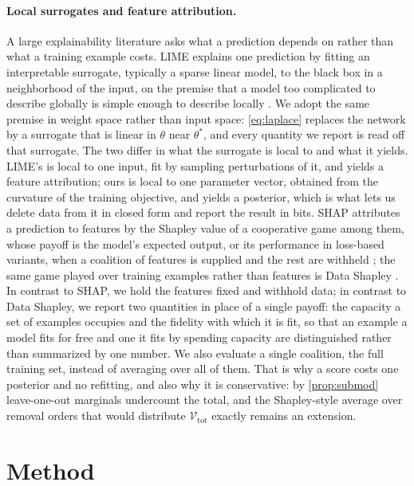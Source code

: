 \documentclass[10pt,twocolumn,letterpaper]{article}
\theoremstyle{definition}
\newcommand{\Vol}{\mathcal{V}}
\begin{document}
\paragraph{Local surrogates and feature attribution.} A large explainability literature asks what a prediction depends on rather than what a training example costs. LIME explains one prediction by fitting an interpretable surrogate, typically a sparse linear model, to the black box in a neighborhood of the input, on the premise that a model too complicated to describe globally is simple enough to describe locally \citep{ribeiro2016}. We adopt the same premise in weight space rather than input space: \cref{eq:laplace} replaces the network by a surrogate that is linear in $\theta$ near $\theta^*$, and every quantity we report is read off that surrogate. The two differ in what the surrogate is local to and what it yields. LIME's is local to one input, fit by sampling perturbations of it, and yields a feature attribution; ours is local to one parameter vector, obtained from the curvature of the training objective, and yields a posterior, which is what lets us delete data from it in closed form and report the result in bits. SHAP attributes a prediction to features by the Shapley value of a cooperative game among them, whose payoff is the model's expected output, or its performance in loss-based variants, when a coalition of features is supplied and the rest are withheld \citep{lundberg2017}; the same game played over training examples rather than features is Data Shapley \citep{ghorbani2019}. In contrast to SHAP, we hold the features fixed and withhold data; in contrast to Data Shapley, we report two quantities in place of a single payoff: the capacity a set of examples occupies and the fidelity with which it is fit, so that an example a model fits for free and one it fits by spending capacity are distinguished rather than summarized by one number. We also evaluate a single coalition, the full training set, instead of averaging over all of them. That is why a score costs one posterior and no refitting, and also why it is conservative: by \cref{prop:submod} leave-one-out marginals undercount the total, and the Shapley-style average over removal orders that would distribute $\Vol_{\mathrm{tot}}$ exactly remains an extension.

\section{Method}
\end{document}
